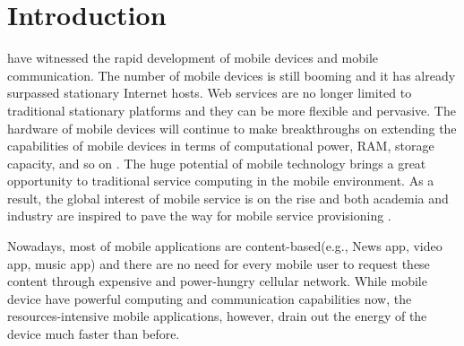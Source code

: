 \documentclass[10pt,journal,compsoc]{IEEEtran}
\begin{document}
\maketitle



\IEEEdisplaynontitleabstractindextext

\IEEEpeerreviewmaketitle


\ifCLASSOPTIONcompsoc
{}
\else
\section{Introduction}
\label{sec:introduction}
\fi


 have witnessed the rapid development of mobile devices and mobile communication. 
The number of mobile devices is still booming and it has already surpassed stationary Internet hosts.
Web services are no longer limited to traditional stationary platforms and they can be more flexible and pervasive. 
The hardware of mobile devices will continue to make breakthroughs on extending the capabilities of mobile devices in terms of computational power, RAM, storage capacity, and so on \cite{Deng2017}. 
The huge potential of mobile technology brings a great opportunity to traditional service computing in the mobile environment. As a result, the global interest of mobile service is on the rise and both academia and industry are inspired to pave the way for mobile service provisioning \cite{dinh2013survey}.

Nowadays, most of mobile applications are content-based(e.g., News app, video app, music app) and there are no need for every mobile user to request these content through expensive and power-hungry cellular network.
While mobile device have powerful computing and communication capabilities now, the resources-intensive mobile applications, however, drain out the energy of the device much faster than before. 
\end{document}
